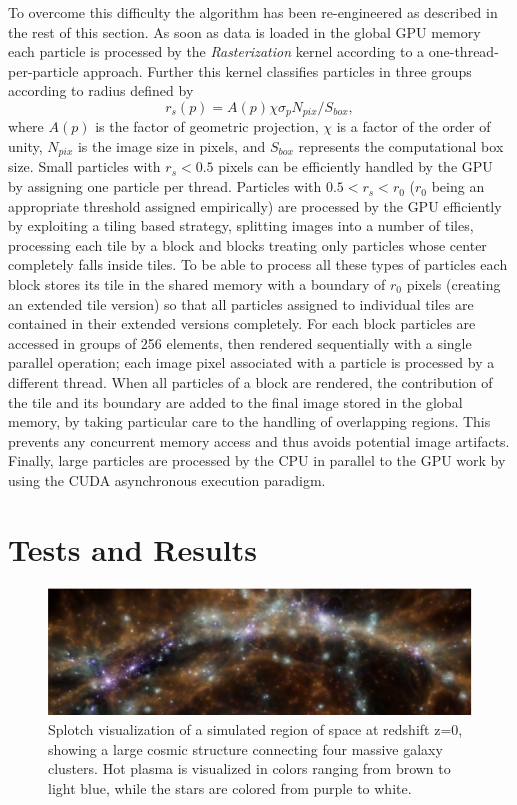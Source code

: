 To overcome this difficulty the algorithm has been re-engineered
as described in the rest of this section. As soon as data is loaded in the global GPU memory each particle is processed by the {\it Rasterization} kernel according to a one-thread-per-particle approach. Further this kernel classifies 
particles in three groups according to radius defined by
\begin{equation}\label{rad2}{r_s(p)}=A(p)\chi \sigma_p N_{pix}/ S_{box},
\end{equation}
where $A(p)$ is the factor of geometric projection, $\chi$ is a factor of the order of unity, $N_{pix}$ is the image size in pixels, and $S_{box}$ represents the computational box size. Small particles with $r_s < 0.5$ pixels can be efficiently handled by the GPU by assigning one particle per thread. Particles with $0.5<r_s<r_0$ ($r_0$ being an appropriate threshold assigned empirically) are processed by the GPU efficiently by exploiting a tiling based strategy, splitting images into a number of tiles, processing each tile by a block and blocks treating only particles whose center completely falls inside tiles. To be able to process all these types of particles each block stores its tile in the shared memory with a boundary of $r_0$ pixels (creating an extended tile version) so that all particles assigned to individual tiles are contained in their extended versions completely. For each block particles are accessed in groups of 256 elements, then rendered sequentially with a single parallel operation; each image pixel associated with a particle is processed by a different thread. When all particles of a block are rendered, the contribution of the tile and its boundary are added to the final image stored in the global memory, by taking particular care to the handling of overlapping regions. This prevents any concurrent memory access and thus avoids potential image artifacts. Finally, large particles are processed by the CPU in parallel 
to the GPU work by using the CUDA asynchronous execution paradigm.

\section{Tests and Results}

\begin{figure}
\centering
\includegraphics[scale=1.0]{part4/Gheller_P013/P013-1.eps}
\caption{Splotch visualization of a simulated region of space at redshift z=0, 
showing a large cosmic structure connecting four massive galaxy clusters. 
Hot plasma is visualized in colors ranging from brown to light blue, 
while the stars are colored from purple to white. 
}

\label{fig:box}
\end{figure}

